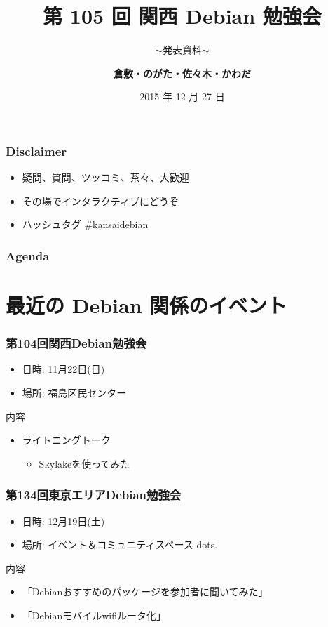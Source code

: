 \documentclass[cjk,dvipdfmx,10pt,compress,%
hyperref={bookmarks=true,bookmarksnumbered=true,bookmarksopen=false,%
colorlinks=false,%
pdftitle={第 105 回 関西 Debian 勉強会},%
pdfauthor={倉敷・のがた・佐々木・かわだ},%
pdfsubject={資料},%
}]{beamer}
\title{第 105 回 関西 Debian 勉強会}
\subtitle{$\sim$発表資料$\sim$}
\author[かわだ てつたろう]{{\large\bf 倉敷・のがた・佐々木・かわだ}}
\institute[Debian JP]{{\normalsize\tt 関西 Debian 勉強会}}
\date{{\small 2015 年 12 月 27 日}}
\begin{document}
\settitleslide
\begin{frame}
\titlepage
\end{frame}
\setdefaultslide

\begin{frame}[fragile]
  \frametitle{Disclaimer}
  \begin{itemize}
  \item 疑問、質問、ツッコミ、茶々、\alert{大歓迎}
  \item その場でインタラクティブにどうぞ
  \item ハッシュタグ \#kansaidebian
  \end{itemize}
\end{frame}

\begin{frame}[fragile]
\frametitle{Agenda}

\tableofcontents

\end{frame}

\section{最近の Debian 関係のイベント}


\begin{frame}[fragile]
  \frametitle{第104回関西Debian勉強会}
  \begin{itemize}
  \item 日時: 11月22日(日)
  \item 場所: 福島区民センター
  \end{itemize}
  \begin{block}{内容}
    \begin{itemize}
    \item ライトニングトーク
      \begin{itemize}
      \item Skylakeを使ってみた
      \end{itemize}
    \end{itemize}
  \end{block}
\end{frame}

\begin{frame}[fragile]
  \frametitle{第134回東京エリアDebian勉強会}
  \begin{itemize}
  \item 日時: 12月19日(土)
  \item 場所: イベント＆コミュニティスペース dots.
  \end{itemize}
  \begin{block}{内容}
    \begin{itemize}
    \item 「Debianおすすめのパッケージを参加者に聞いてみた」
    \item 「Debianモバイルwifiルータ化」
    \end{itemize}
  \end{block}
\end{frame}
\end{document}
